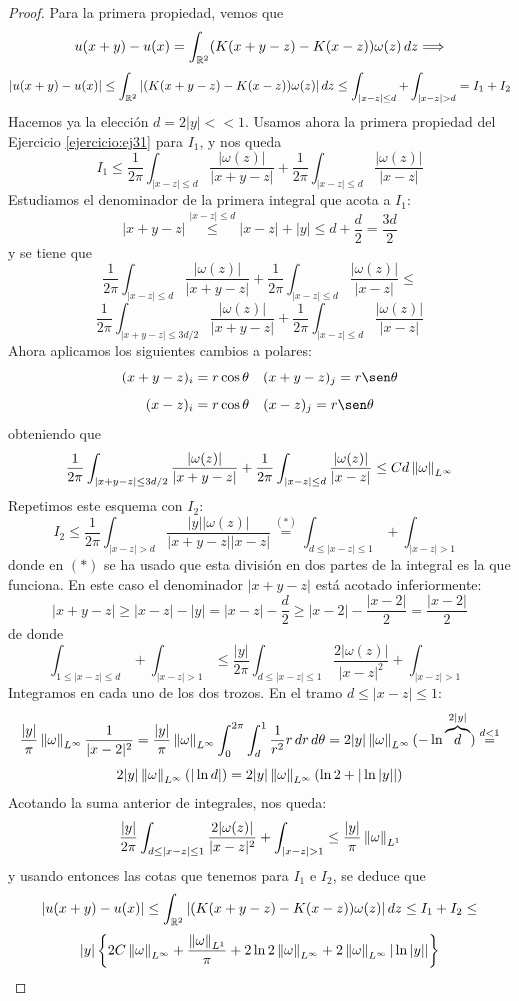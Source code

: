 \begin{proof}
    Para la primera propiedad, vemos que 
    $$u(x+y) - u(x) = \int_{\mathbb{R}^2} (K(x+y-z) - K(x-z)) \omega(z)\,dz \Longrightarrow$$
    $$|u(x+y) - u(x)| \leq \int_{\mathbb{R}^2} |(K(x+y-z) - K(x-z)) \omega(z)|\,dz \leq \int_{|x-z| \leq d} + \int_{|x-z| > d} = I_1 + I_2$$
    Hacemos ya la elección $d = 2|y| << 1$. Usamos ahora la primera propiedad del Ejercicio \ref{ejercicio:ej31} para $I_1$, y nos queda
    $$I_1 \leq \dfrac{1}{2 \pi} \int_{|x-z| \leq d} \dfrac{|\omega(z)|}{|x+y-z|} + \dfrac{1}{2 \pi} \int_{|x-z| \leq d} \dfrac{|\omega(z)|}{|x-z|}$$
    Estudiamos el denominador de la primera integral que acota a $I_1$:
    $$|x+y-z| \stackrel{|x-z| \leq d}{\leq} |x-z| + |y| \leq d + \dfrac{d}{2} = \dfrac{3d}{2}$$
    y se tiene que 
    $$\dfrac{1}{2 \pi} \int_{|x-z| \leq d} \dfrac{|\omega(z)|}{|x+y-z|} + \dfrac{1}{2 \pi} \int_{|x-z| \leq d} \dfrac{|\omega(z)|}{|x-z|} \leq $$
    $$\dfrac{1}{2 \pi} \int_{|x+y-z| \leq 3d/2} \dfrac{|\omega(z)|}{|x+y-z|} + \dfrac{1}{2 \pi} \int_{|x-z| \leq d} \dfrac{|\omega(z)|}{|x-z|}$$
    Ahora aplicamos los siguientes cambios a polares:
    $$(x+y-z)_i = r \cos \theta \quad (x+y-z)_j = r \sen \theta$$
    $$(x-z)_i = r \cos \theta \quad (x-z)_j = r \sen \theta$$
    obteniendo que 
    $$\dfrac{1}{2 \pi} \int_{|x+y-z| \leq 3d/2} \dfrac{|\omega(z)|}{|x+y-z|} + \dfrac{1}{2 \pi} \int_{|x-z| \leq d} \dfrac{|\omega(z)|}{|x-z|} \leq 
    C d \left\lVert \omega \right\rVert_{L^\infty}$$
    Repetimos este esquema con $I_2$:
    $$I_2 \leq \dfrac{1}{2 \pi} \int_{|x-z| > d} \dfrac{|y| |\omega(z)|}{|x+y-z| |x-z|} \stackrel{(*)}{=} \int_{d \leq |x-z| \leq 1} + \int_{|x-z| > 1}$$
    donde en $(*)$ se ha usado que esta división en dos partes de la integral es la que funciona.
    En este caso el denominador $|x+y-z|$ está acotado inferiormente:
    $$|x+y-z| \geq |x-z| - |y| = |x-z| - \dfrac{d}{2} \geq |x-2| - \dfrac{|x-2|}{2} = \dfrac{|x-2|}{2}$$
    de donde
    $$\int_{1 \leq |x-z| \leq d} + \int_{|x-z| > 1} \leq \dfrac{|y|}{2 \pi} \int_{d \leq |x-z| \leq 1} \dfrac{2 |\omega(z)|}{|x-z|^2} + \int_{|x-z| > 1}$$
    Integramos en cada uno de los dos trozos. En el tramo $d \leq |x-z| \leq 1$:
    $$\dfrac{|y|}{\pi} \left\lVert \omega \right\rVert_{L^\infty} \dfrac{1}{|x-2|^2} = \dfrac{|y|}{\pi} \left\lVert \omega \right\rVert_{L^\infty} \int_{0}^{2 \pi} \int_{d}^{1} \dfrac{1}{r^2}
    r\,dr\,d \theta = 2 |y|\left\lVert \omega \right\rVert_{L^\infty}(-\ln \overbrace{d}^{2 |y|}) \stackrel{d < 1}{=} $$
    $$2 |y| \left\lVert \omega \right\rVert_{L^\infty}(|\ln d|) = 2 |y| \left\lVert \omega \right\rVert_{L^\infty} (\ln 2 + |\ln|y||)$$
    Acotando la suma anterior de integrales, nos queda:
    $$\dfrac{|y|}{2 \pi} \int_{d \leq |x-z| \leq 1} \dfrac{2 |\omega(z)|}{|x-z|^2} + \int_{|x-z| > 1} \leq \dfrac{|y|}{\pi} \left\lVert \omega \right\rVert_{L^1}$$
    y usando entonces las cotas que tenemos para $I_1$ e $I_2$, se deduce que 
    $$|u(x+y) - u(x)| \leq \int_{\mathbb{R}^2} |(K(x+y-z) - K(x-z)) \omega(z)|\,dz \leq I_1 + I_2 \leq$$
    $$|y| \left\{2 C \left\lVert \omega \right\rVert_{L^\infty} + \dfrac{\left\lVert \omega \right\rVert_{L^1}}{\pi} + 2 \ln 2 \left\lVert \omega \right\rVert_{L^\infty} + 
    2 \left\lVert \omega \right\rVert_{L^\infty} |\ln|y|| \right\}$$
\end{proof}

